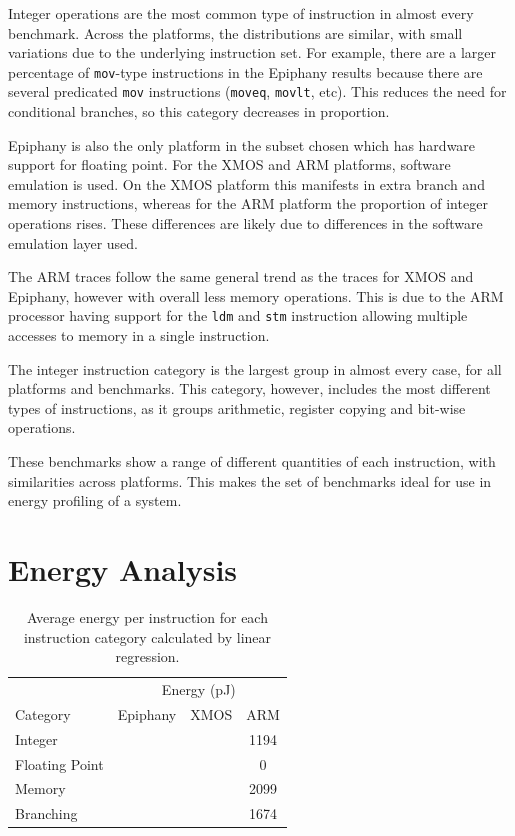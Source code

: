 \documentclass[twocolumn]{article}
\begin{document}
Integer operations are the most common type of instruction in almost every benchmark. Across the platforms, the distributions are similar, with small variations due to the underlying instruction set. For example, there are a larger percentage of \texttt{mov}-type instructions in the Epiphany results because there are several predicated \texttt{mov} instructions (\texttt{moveq}, \texttt{movlt}, etc). This reduces the need for conditional branches, so this category decreases in proportion.

Epiphany is also the only platform in the subset chosen which has hardware support for floating point. For the XMOS and ARM platforms, software emulation is used. On the XMOS platform this manifests in extra branch and memory instructions, whereas for the ARM platform the proportion of integer operations rises. These differences are likely due to differences in the software emulation layer used.

The ARM traces follow the same general trend as the traces for XMOS and Epiphany, however with overall less memory operations. This is due to the ARM processor having support for the \texttt{ldm} and \texttt{stm} instruction allowing multiple accesses to memory in a single instruction.

The integer instruction category is the largest group in almost every case, for all platforms and benchmarks. This category, however, includes the most different types of instructions, as it groups arithmetic, register copying and bit-wise operations.

These benchmarks show a range of different quantities of each instruction, with similarities across platforms. This makes the set of benchmarks ideal for use in energy profiling of a system.

\section{Energy Analysis}

\begin{table}
	\centering
	\begin{tabular}{l c c c}
						& \multicolumn{3}{c}{Energy (pJ)}\\
		Category 		& Epiphany 	& XMOS 	& ARM  	\\
		\hline
		Integer 		&			&		& 1194 	\\
		Floating Point 	&			&		& 0		\\
		Memory			&			&		& 2099	\\
		Branching		&			&		& 1674	\\
	\end{tabular}
	\caption{Average energy per instruction for each instruction category calculated by linear regression.}
	\label{Table:RegressionResults}
\end{table}
\end{document}
